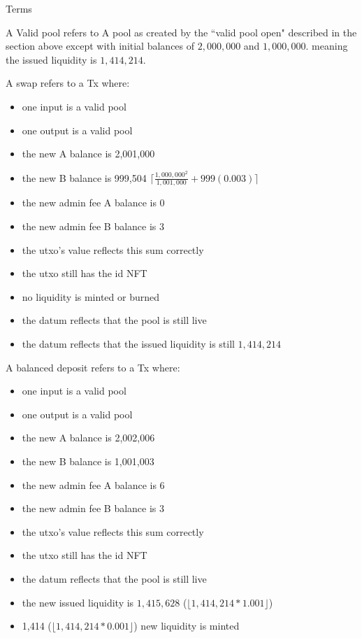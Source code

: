 \documentclass{article}
\begin{document}
Terms

A Valid pool refers to
A pool as created by the ``valid pool open" described in the section above
except with initial balances of $2,000,000$ and $1,000,000$.
meaning the issued liquidity is $1,414,214$.

A swap refers to a Tx where:
\begin{itemize}
	\item one input is a valid pool
	\item one output is a valid pool
	\item the new A balance is 2,001,000
	\item the new B balance is 999,504 $\lceil \frac{1,000,000^2}{1,001,000}+999(0.003) \rceil$
	\item the new admin fee A balance is 0
	\item the new admin fee B balance is 3
	\item the utxo's value reflects this sum correctly
	\item the utxo still has the id NFT
	\item no liquidity is minted or burned
	\item the datum reflects that the pool is still live
	\item the datum reflects that the issued liquidity is still $1,414,214$
\end{itemize}

A balanced deposit refers to a Tx where:
\begin{itemize}
	\item one input is a valid pool
	\item one output is a valid pool
	\item the new A balance is 2,002,006
	\item the new B balance is 1,001,003
	\item the new admin fee A balance is 6
	\item the new admin fee B balance is 3
	\item the utxo's value reflects this sum correctly
	\item the utxo still has the id NFT
	\item the datum reflects that the pool is still live
	\item the new issued liquidity is $1,415,628$ ($\lfloor 1,414,214*1.001 \rfloor$)
	\item 1,414 ($\lfloor 1,414,214*0.001 \rfloor$) new liquidity is minted
\end{itemize}
\end{document}

